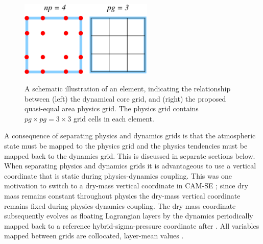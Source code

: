 \documentclass[twocol]{ametsoc}
\begin{document}
\begin{figure}[t]
\begin{center}
\noindent\includegraphics[width=15pc,angle=0]{figs/np4_pg3.pdf}\\
\end{center}
\caption{A schematic illustration of an element, indicating the relationship between (left) the dynamical core grid, and (right) the proposed quasi-equal area physics grid. The physics grid contains $pg\times pg=3\times 3$ grid cells in each element.}
\label{fig:np4_pg3}
\end{figure}

A consequence of separating physics and dynamics grids is that the atmospheric state must be mapped to the physics grid and the physics tendencies must be mapped back to the dynamics grid. This is discussed in separate sections below. When separating physics and dynamics grids it is advantageous to use a vertical coordinate that is static during physics-dynamics coupling. This was one motivation to switch to a dry-mass vertical coordinate in CAM-SE \citep{LetAl2018JAMES}; since dry mass remains constant throughout physics the dry-mass vertical coordinate remains fixed during physics-dynamics coupling. {\color{red}The dry mass coordinate subsequently evolves as floating Lagrangian layers by the dynamics \citep{L2004MWR} periodically mapped back to a reference hybrid-sigma-pressure coordinate after \cite{SB1981MWR}. All variables mapped between grids are collocated, layer-mean values \citep{LetAl2018JAMES}.{}}
 
\end{document}
